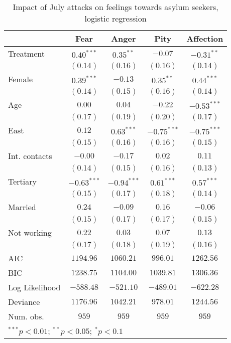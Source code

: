 
\begin{table}
\caption{Impact of July attacks on feelings towards asylum seekers, logistic regression}
\begin{center}
\begin{tabular}{l c c c c}
\toprule
 & Fear & Anger & Pity & Affection \\
\midrule
Treatment      & $0.40^{***}$  & $0.35^{**}$   & $-0.07$       & $-0.31^{**}$  \\
               & $(0.14)$      & $(0.16)$      & $(0.16)$      & $(0.14)$      \\
Female         & $0.39^{***}$  & $-0.13$       & $0.35^{**}$   & $0.44^{***}$  \\
               & $(0.14)$      & $(0.15)$      & $(0.16)$      & $(0.14)$      \\
Age            & $0.00$        & $0.04$        & $-0.22$       & $-0.53^{***}$ \\
               & $(0.17)$      & $(0.19)$      & $(0.20)$      & $(0.17)$      \\
East           & $0.12$        & $0.63^{***}$  & $-0.75^{***}$ & $-0.75^{***}$ \\
               & $(0.15)$      & $(0.16)$      & $(0.16)$      & $(0.15)$      \\
Int. contacts  & $-0.00$       & $-0.17$       & $0.02$        & $0.11$        \\
               & $(0.14)$      & $(0.15)$      & $(0.16)$      & $(0.13)$      \\
Tertiary       & $-0.63^{***}$ & $-0.94^{***}$ & $0.61^{***}$  & $0.57^{***}$  \\
               & $(0.15)$      & $(0.17)$      & $(0.18)$      & $(0.14)$      \\
Married        & $0.24$        & $-0.09$       & $0.16$        & $-0.06$       \\
               & $(0.15)$      & $(0.17)$      & $(0.17)$      & $(0.15)$      \\
Not working    & $0.22$        & $0.03$        & $0.07$        & $0.13$        \\
               & $(0.17)$      & $(0.18)$      & $(0.19)$      & $(0.16)$      \\
\midrule
AIC            & $1194.96$     & $1060.21$     & $996.01$      & $1262.56$     \\
BIC            & $1238.75$     & $1104.00$     & $1039.81$     & $1306.36$     \\
Log Likelihood & $-588.48$     & $-521.10$     & $-489.01$     & $-622.28$     \\
Deviance       & $1176.96$     & $1042.21$     & $978.01$      & $1244.56$     \\
Num. obs.      & $959$         & $959$         & $959$         & $959$         \\
\bottomrule
\multicolumn{5}{l}{\scriptsize{$^{***}p<0.01$; $^{**}p<0.05$; $^{*}p<0.1$}}
\end{tabular}
\label{tab_emo_glm}
\end{center}
\end{table}
